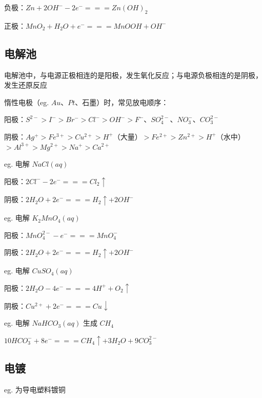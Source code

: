 \documentclass[UTF8,zihao=-4,openany]{ctexbook}
\begin{document}
负极：$Zn+2OH^--2e^-=\!=\!=Zn(OH)_2$\par

正极：$MnO_2+H_2O+e^-=\!=\!=MnOOH+OH^-$\par
\subsection{电解池}
电解池中，与电源正极相连的是阳极，发生氧化反应；与电源负极相连的是阴极，发生还原反应\par

惰性电极（eg. $Au$、$Pt$、石墨）时，常见放电顺序：\par

阳极：$S^{2-}>I^->Br^->Cl^->OH^->F^-$、$SO_4^{2-}$、$NO_3^-$、$CO_3^{2-}$\par

阴极：$Ag^+>Fe^{3+}>Cu^{2+}>H^+$（大量）$>Fe^{2+}>Zn^{2+}>H^+$（水中）$>Al^{3+}>Mg^{2+}>Na^+>Ca^{2+}$\par

eg. 电解 $NaCl(aq)$\par

阳极：$2Cl^--2e^-=\!=\!=Cl_2\uparrow$\par

阴极：$2H_2O+2e^-=\!=\!=H_2\uparrow+2OH^-$\par

\medskip
eg. 电解 $K_2MnO_4(aq)$\par

阳极：$MnO_4^{2-}-e^-=\!=\!=MnO_4^-$\par

阴极：$2H_2O+2e^-=\!=\!=H_2\uparrow+2OH^-$\par

\medskip
eg. 电解 $CuSO_4(aq)$\par

阳极：$2H_2O-4e^-=\!=\!=4H^++O_2\uparrow$\par

阴极：$Cu^{2+}+2e^-=\!=\!=Cu\downarrow$\par

\medskip
eg. 电解 $NaHCO_3(aq)$ 生成 $CH_4$\par

$10HCO_3^-+8e^-=\!=\!=CH_4\uparrow+3H_2O+9CO_3^{2-}$\par
\subsection{电镀}
eg. 为导电塑料镀铜\par
\end{document}
